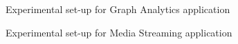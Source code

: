 \begin{figure}[!h]
  \vspace{-0.2cm}
  \centering
   {}
      \caption{Experimental set-up for Graph Analytics application}
  \label{fig:testbed_analytics}
  \vspace{-0.1cm}
\end{figure}

\begin{figure}[!h]
  \vspace{-0.2cm}
  \centering
   {}
         \caption{Experimental set-up for Media Streaming application}
  \label{fig:testbed_media}
  \vspace{-0.1cm}
\end{figure}

